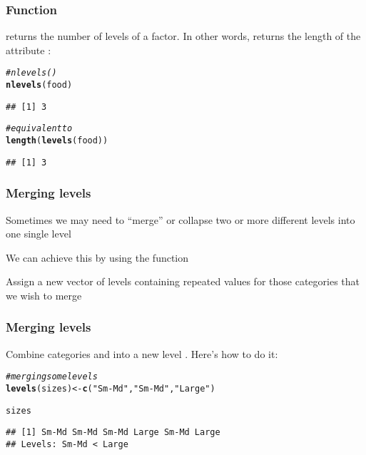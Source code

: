 \documentclass[12pt]{beamer}\usepackage[]{graphicx}\usepackage[]{color}
\makeatletter
\newcommand{\hlstr}[1]{\textcolor[rgb]{0.192,0.494,0.8}{#1}}%
\newcommand{\hlcom}[1]{\textcolor[rgb]{0.678,0.584,0.686}{\textit{#1}}}%
\newcommand{\hlstd}[1]{\textcolor[rgb]{0.345,0.345,0.345}{#1}}%
\newcommand{\hlkwb}[1]{\textcolor[rgb]{0.69,0.353,0.396}{#1}}%
\newcommand{\hlkwd}[1]{\textcolor[rgb]{0.737,0.353,0.396}{\textbf{#1}}}%
\newenvironment{kframe}{%
 \def\at@end@of@kframe{}%
 \ifinner\ifhmode%
  \def\at@end@of@kframe{\end{minipage}}%
  \begin{minipage}{\columnwidth}%
 \fi\fi%
 \def\FrameCommand##1{\hskip\@totalleftmargin \hskip-\fboxsep
 \colorbox{shadecolor}{##1}\hskip-\fboxsep
     \hskip-\linewidth \hskip-\@totalleftmargin \hskip\columnwidth}%
 \MakeFramed {\advance\hsize-\width
   \@totalleftmargin\z@ \linewidth\hsize
   \@setminipage}}%
 {\par\unskip\endMakeFramed%
 \at@end@of@kframe}
\newenvironment{knitrout}{}{} %
\makeatother
\begin{document}
\begin{frame}[fragile]
\frametitle{Function }

 returns the number of levels of a factor. In other words,  returns the length of the attribute :
\begin{knitrout}\footnotesize
{}\color{fgcolor}\begin{kframe}
\begin{alltt}
\hlcom{# nlevels()}
\hlkwd{nlevels}\hlstd{(food)}
\end{alltt}
\begin{verbatim}
## [1] 3
\end{verbatim}
\begin{alltt}
\hlcom{# equivalent to}
\hlkwd{length}\hlstd{(}\hlkwd{levels}\hlstd{(food))}
\end{alltt}
\begin{verbatim}
## [1] 3
\end{verbatim}
\end{kframe}
\end{knitrout}

\end{frame}


\begin{frame}
\frametitle{Merging levels}

\bi
  \item Sometimes we may need to ``merge'' or collapse two or more different levels into one single level
  \item We can achieve this by using the function 
  \item Assign a new vector of levels containing repeated values for those categories that we wish to merge
\ei

\end{frame}


\begin{frame}[fragile]
\frametitle{Merging levels}

Combine categories  and  into a new level . Here's how to do it:
\begin{knitrout}\footnotesize
{}\color{fgcolor}\begin{kframe}
\begin{alltt}
\hlcom{# merging some levels}
\hlkwd{levels}\hlstd{(sizes)} \hlkwb{<-} \hlkwd{c}\hlstd{(}\hlstr{"Sm-Md"}\hlstd{,} \hlstr{"Sm-Md"}\hlstd{,} \hlstr{"Large"}\hlstd{)}

\hlstd{sizes}
\end{alltt}
\begin{verbatim}
## [1] Sm-Md Sm-Md Sm-Md Large Sm-Md Large
## Levels: Sm-Md < Large
\end{verbatim}
\end{kframe}
\end{knitrout}

\end{frame}
\end{document}
